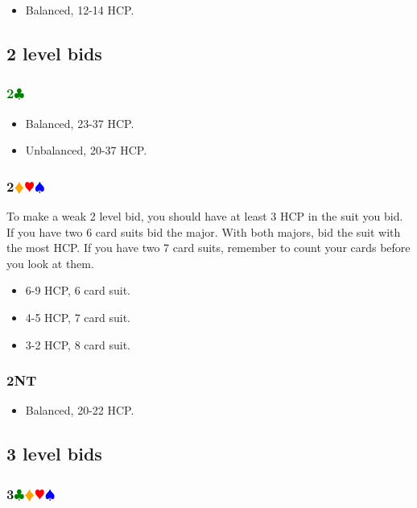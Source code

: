 \documentclass{article}
\newcommand{\Hs}{\textcolor{Red}{$\varheart$}}
\newcommand{\Ss}{\textcolor{Blue}{$\spadesuit$}}
\newcommand{\Ds}{\textcolor{Orange}{$\vardiamond$}}
\newcommand{\Cs}{\textcolor{Green}{$\clubsuit$}}
\newcommand{\NTs}{\textbf{\footnotesize{NT}}}
\newcommand{\C}[1]{\textcolor{Green}{\textbf{#1}\Cs}}
\newcommand{\NT}[1]{\textbf{#1\NTs}}
\newcommand{\suits}[1]{\textbf{#1}\Cs\Ds\Hs\Ss}
\newcommand{\notclubs}[1]{\textbf{#1}\Ds\Hs\Ss}
\begin{document}
\begin{itemize}
\item Balanced, 12-14 HCP.
\end{itemize}

\subsection{2 level bids}

\subsubsection{\C{2}}

\begin{itemize}
\item Balanced, 23-37 HCP.
\item Unbalanced, 20-37 HCP.
\end{itemize}

\subsubsection{\notclubs{2}}

To make a weak 2 level bid, you should have at least 3 HCP in the suit you bid. If you have two 6 card suits bid the major. With both majors, bid the suit with the most HCP. If you have two 7 card suits, remember to count your cards before you look at them.

\begin{itemize}
\item 6-9 HCP, 6 card suit.
\item 4-5 HCP, 7 card suit.
\item 3-2 HCP, 8 card suit.
\end{itemize}

\subsubsection{\NT{2}}

\begin{itemize}
\item Balanced, 20-22 HCP.
\end{itemize}

\subsection{3 level bids}

\subsubsection{\suits{3}}
\end{document}
